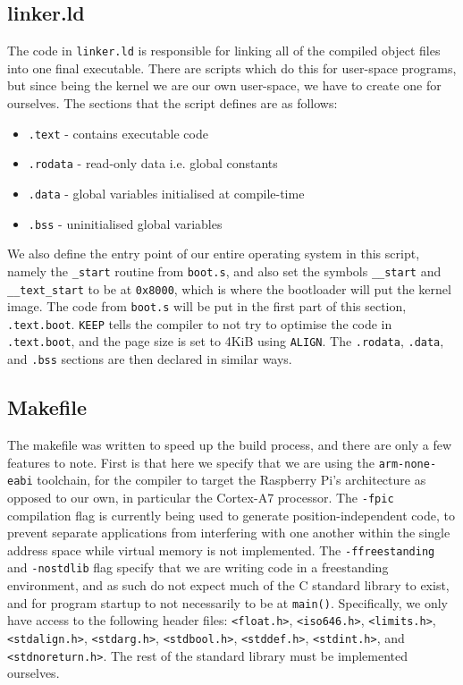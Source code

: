 \documentclass[10pt,a4paper]{article}
\newcommand{\code}[1]{\texttt{#1}}
\begin{document}
\subsection*{linker.ld}
The code in \code{linker.ld} is responsible for linking all of the compiled
object files into one final executable. There are scripts which do this for
user-space programs, but since being the kernel we are our own user-space, we
have to create one for ourselves. The sections that the script defines are as
follows:
\begin{itemize}
    \itemsep0em
    \item \code{.text} - contains executable code
    \item \code{.rodata} - read-only data i.e. global constants
    \item \code{.data} - global variables initialised at compile-time
    \item \code{.bss} - uninitialised global variables
\end{itemize}

We also define the entry point of our entire operating system in this script,
namely the \code{\_start} routine from \code{boot.s}, and also set the symbols
\code{\_\_start} and \code{\_\_text\_start} to be at \code{0x8000}, which is
where the bootloader will put the kernel image. The code from \code{boot.s} will
be put in the first part of this section, \code{.text.boot}. \code{KEEP} tells
the compiler to not try to optimise the code in \code{.text.boot}, and the page
size is set to 4KiB using \code{ALIGN}. The \code{.rodata}, \code{.data}, and
\code{.bss} sections are then declared in similar ways.

\subsection*{Makefile}
The makefile was written to speed up the build process, and there are only a few
features to note. First is that here we specify that we are using the
\code{arm-none-eabi} toolchain, for the compiler to target the Raspberry Pi's
architecture as opposed to our own, in particular the Cortex-A7 processor. The
\code{-fpic} compilation flag is currently being used to generate
position-independent code, to prevent separate applications from interfering
with one another within the single address space while virtual memory is not
implemented. The \code{-ffreestanding} and \code{-nostdlib} flag specify that we
are writing code in a freestanding environment, and as such do not expect much
of the C standard library to exist, and for program startup to not necessarily
to be at \code{main()}.  Specifically, we only have access to the following
header files: \code{<float.h>}, \code{<iso646.h>}, \code{<limits.h>},
\code{<stdalign.h>}, \code{<stdarg.h>}, \code{<stdbool.h>}, \code{<stddef.h>},
\code{<stdint.h>}, and \code{<stdnoreturn.h>}. The rest of the standard library
must be implemented ourselves.
\end{document}
